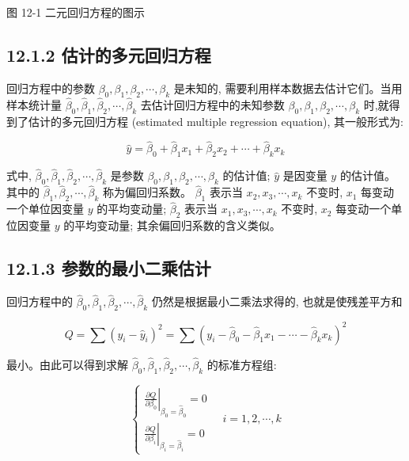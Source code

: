 \documentclass[10pt]{article}
\begin{document}
\begin{CJK*}{UTF8}{bsmi}
\begin{center}
\end{center}

图 12-1 二元回归方程的图示

\subsection*{12.1.2 估计的多元回归方程}
回归方程中的参数 $\beta_{0}, \beta_{1}, \beta_{2}, \cdots, \beta_{k}$ 是未知的, 需要利用样本数据去估计它们。当用样本统计量 $\hat{\beta}_{0}, \hat{\beta}_{1}, \hat{\beta}_{2}, \cdots, \hat{\beta}_{k}$ 去估计回归方程中的未知参数 $\beta_{0}, \beta_{1}, \beta_{2}, \cdots, \beta_{k}$ 时,就得到了估计的多元回归方程 (estimated multiple regression equation), 其一般形式为:


\begin{equation*}
\hat{y}=\hat{\beta}_{0}+\hat{\beta}_{1} x_{1}+\hat{\beta}_{2} x_{2}+\cdots+\hat{\beta}_{k} x_{k} \tag{12.3}
\end{equation*}


式中, $\hat{\beta}_{0}, \hat{\beta}_{1}, \hat{\beta}_{2}, \cdots, \hat{\beta}_{k}$ 是参数 $\beta_{0}, \beta_{1}, \beta_{2}, \cdots, \beta_{k}$ 的估计值; $\hat{y}$ 是因变量 $y$ 的估计值。其中的 $\hat{\beta}_{1}, \hat{\beta}_{2}, \cdots, \hat{\beta}_{k}$ 称为偏回归系数。 $\hat{\beta}_{1}$ 表示当 $x_{2}, x_{3}, \cdots, x_{k}$ 不变时, $x_{1}$ 每变动一个单位因变量 $y$ 的平均变动量; $\hat{\beta}_{2}$ 表示当 $x_{1}, x_{3}, \cdots, x_{k}$ 不变时, $x_{2}$ 每变动一个单位因变量 $y$ 的平均变动量; 其余偏回归系数的含义类似。

\subsection*{12.1.3 参数的最小二乘估计}
回归方程中的 $\hat{\beta}_{0}, \hat{\beta}_{1}, \hat{\beta}_{2}, \cdots, \hat{\beta}_{k}$ 仍然是根据最小二乘法求得的, 也就是使残差平方和


\begin{equation*}
Q=\sum\left(y_{i}-\hat{y}_{i}\right)^{2}=\sum\left(y_{i}-\hat{\beta}_{0}-\hat{\beta}_{1} x_{1}-\cdots-\hat{\beta}_{k} x_{k}\right)^{2} \tag{12.4}
\end{equation*}


最小。由此可以得到求解 $\hat{\beta}_{0}, \hat{\beta}_{1}, \hat{\beta}_{2}, \cdots, \hat{\beta}_{k}$ 的标准方程组:

\[
\left\{\begin{array}{l}
\left.\frac{\partial Q}{\partial \beta_{0}}\right|_{\beta_{0}=\hat{\beta}_{0}}=0  \tag{12.5}\\
\left.\frac{\partial Q}{\partial \beta_{i}}\right|_{\beta_{i}=\hat{\beta}_{i}}=0
\end{array} \quad i=1,2, \cdots, k\right.
\]


\end{CJK*}
\end{document}
